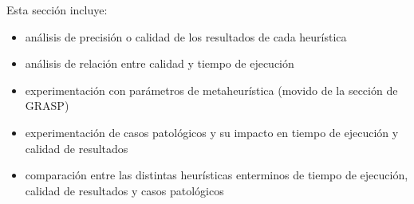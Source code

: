 		Esta sección incluye:

		\begin{itemize}
			\item análisis de precisión o calidad de los resultados de cada heurística

			\item análisis de relación entre calidad y tiempo de ejecución

			\item experimentación con parámetros de metaheurística (movido de la sección de GRASP)

			\item experimentación de casos patológicos y su impacto en tiempo de ejecución y calidad de resultados

			\item comparación entre las distintas heurísticas enterminos de tiempo de ejecución, calidad de resultados y casos patológicos
		\end{itemize}